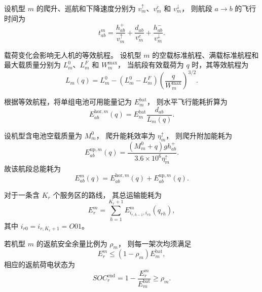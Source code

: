 设机型 $m$ 的爬升、巡航和下降速度分别为
$v_m^{\uparrow}$、$v_m^{c}$ 和 $v_m^{\downarrow}$，
则航段 $a\rightarrow b$ 的飞行时间为
\begin{equation}
	t_{ab}^{m}
	=
	\frac{h_{ab}^{+}}{v_m^{\uparrow}}
	+
	\frac{d_{ab}}{v_m^{c}}
	+
	\frac{h_{ab}^{-}}{v_m^{\downarrow}}.
	\label{eq:q2-flight-time}
\end{equation}

载荷变化会影响无人机的等效航程。
设机型 $m$ 的空载标准航程、满载标准航程和最大载质量分别为
$L_m^0$、$L_m^F$ 和 $W_m^{\max}$，
当航段有效载荷为 $q$ 时，其等效航程为
\begin{equation}
	L_m(q)
	=
	L_m^0-
	\left(L_m^0-L_m^F\right)
	\left(\frac{q}{W_m^{\max}}\right)^{3/2}.
	\label{eq:q2-range}
\end{equation}

根据等效航程，将单组电池可用能量记为 $E_m^{\mathrm{bat}}$，
则水平飞行能耗折算为
\begin{equation}
	E_{ab}^{\mathrm{hor},m}(q)
	=
	E_m^{\mathrm{bat}}
	\frac{d_{ab}}{L_m(q)}.
	\label{eq:q2-horizontal-energy}
\end{equation}

设机型含电池空载质量为 $M_m^0$，
爬升能耗效率为 $\eta_m^{\uparrow}$，
则爬升附加能耗为
\begin{equation}
	E_{ab}^{\mathrm{up},m}(q)
	=
	\frac{
		(M_m^0+q)g h_{ab}^{+}
	}{
		3.6\times10^6\eta_m^{\uparrow}
	}.
	\label{eq:q2-climb-energy}
\end{equation}
故该航段总能耗为
\begin{equation}
	E_{ab}^{m}(q)
	=
	E_{ab}^{\mathrm{hor},m}(q)
	+
	E_{ab}^{\mathrm{up},m}(q).
	\label{eq:q2-leg-energy}
\end{equation}

对于一条含 $K_r$ 个服务区的路线，
其总运输能耗为
\begin{equation}
	E_r^m
	=
	\sum_{h=1}^{K_r+1}
	E_{i_{r,h-1},i_{rh}}^m(q_{rh}),
	\label{eq:q2-route-energy}
\end{equation}
其中 $i_{r0}=i_{r,K_r+1}=O01$。

若机型 $m$ 的返航安全余量比例为 $\rho_m$，
则每一架次均须满足
\begin{equation}
	E_r^m
	\le
	(1-\rho_m)E_m^{\mathrm{bat}},
	\label{eq:q2-energy-reserve}
\end{equation}
相应的返航荷电状态为
\begin{equation}
	SOC_r^{\mathrm{end}}
	=
	1-\frac{E_r^m}{E_m^{\mathrm{bat}}}
	\ge \rho_m.
	\label{eq:q2-soc}
\end{equation}

